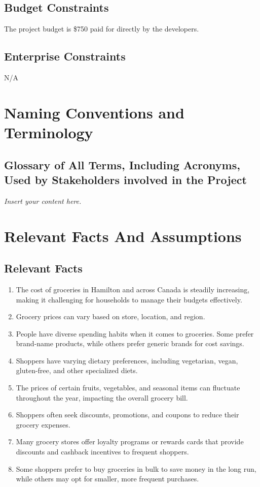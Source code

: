 \documentclass[12pt]{article}
\newcommand{\lips}{\textit{Insert your content here.}}
\begin{document}
\subsection{Budget Constraints}
The project budget is \$750 paid for directly by the developers.
\subsection{Enterprise Constraints}
N/A
\section{Naming Conventions and Terminology}
\subsection{Glossary of All Terms, Including Acronyms, Used by Stakeholders
involved in the Project}
\lips

\section{Relevant Facts And Assumptions}
\subsection{Relevant Facts}
\begin{enumerate}
    \item The cost of groceries in Hamilton and across Canada is steadily increasing, making it challenging for households to manage their budgets effectively.
    \item Grocery prices can vary based on store, location, and region.
    \item People have diverse spending habits when it comes to groceries. Some prefer brand-name products, while others prefer generic brands for cost savings.
    \item Shoppers have varying dietary preferences, including vegetarian, vegan, gluten-free, and other specialized diets.
    \item The prices of certain fruits, vegetables, and seasonal items can fluctuate throughout the year, impacting the overall grocery bill.
    \item Shoppers often seek discounts, promotions, and coupons to reduce their grocery expenses.
    \item Many grocery stores offer loyalty programs or rewards cards that provide discounts and cashback incentives to frequent shoppers.
    \item Some shoppers prefer to buy groceries in bulk to save money in the long run, while others may opt for smaller, more frequent purchases.
\end{enumerate}
\end{document}
